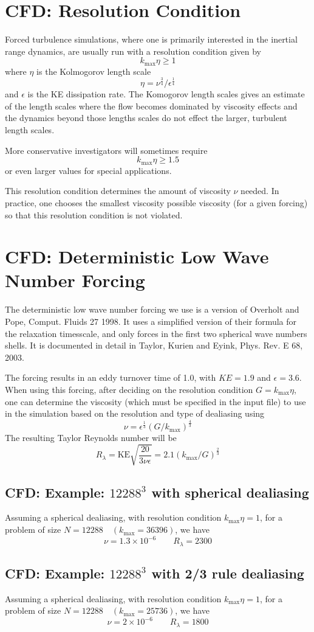 \documentclass[12pt]{article}
\begin{document}
\section{CFD: Resolution Condition}

Forced turbulence simulations, where one is primarily interested in
the inertial range dynamics, are usually run with a resolution condition
given by
\[
   k_\text{max} \eta \ge 1
\]
where $\eta$ is the Kolmogorov length scale
\[
\eta =   {\nu^{\frac34}} / {\epsilon^\frac14} 
\]
and $\epsilon$ is the KE dissipation rate.  The Komogorov length scales gives an estimate of the length scales
where the flow becomes dominated by viscosity effects and the dynamics
beyond those lengths scales do not effect the larger, turbulent length
scales.

More conservative investigators will sometimes require
\[
   k_\text{max} \eta \ge 1.5
\]
or even larger values for special applications.  

This resolution condition determines the amount of viscosity $\nu$
needed.  In practice, one chooses the smallest viscosity possible
viscosity (for a given forcing) so that this resolution condition is
not violated.


\section{CFD: Deterministic Low Wave Number Forcing}

The deterministic low wave number forcing we use is a version
of Overholt and Pope, Comput. Fluids 27 1998.  It uses a simplified
version of their formula for the relaxation timesscale, and only forces
in the first two spherical wave numbers shells.
It is documented in detail in Taylor, Kurien and Eyink, Phys. Rev. E 68, 2003. 

The forcing results in an eddy turnover time of 1.0,
with $KE=1.9$ and $\epsilon=3.6$.  When using this forcing,
after deciding on the resolution condition $G=k_\text{max} \eta$,
one can determine the viscosity (which must be specified in the
input file) to use in the simulation based on the resolution and type of dealiasing
using
\[
 \nu = \epsilon^{\frac13} \left( {G}/{k_\text{max}} \right)^{\frac43}
\]
The resulting Taylor Reynolds number will be
\[
R_\lambda = \text{KE} \sqrt{\frac{20}{3\nu\epsilon}}  = 2.1 (k_\text{max}/G)^{\frac23}
\]

\subsection{CFD: Example: $12288^3$ with spherical dealiasing}
Assuming a spherical dealiasing, with resolution condition $k_\text{max} \eta=1$, 
for a problem of size $N=12288 \quad (k_\text{max} = 36396)$, we have
\[
\nu = 1.3 \times 10^{-6} \qquad  R_\lambda =  2300
\]

\subsection{CFD: Example: $12288^3$ with 2/3 rule dealiasing}
Assuming a spherical dealiasing, with resolution condition $k_\text{max} \eta=1$, 
for a problem of size $N=12288 \quad (k_\text{max} = 25736)$, we have
\[
\nu = 2 \times 10^{-6} \qquad  R_\lambda =  1800
\]
\end{document}
